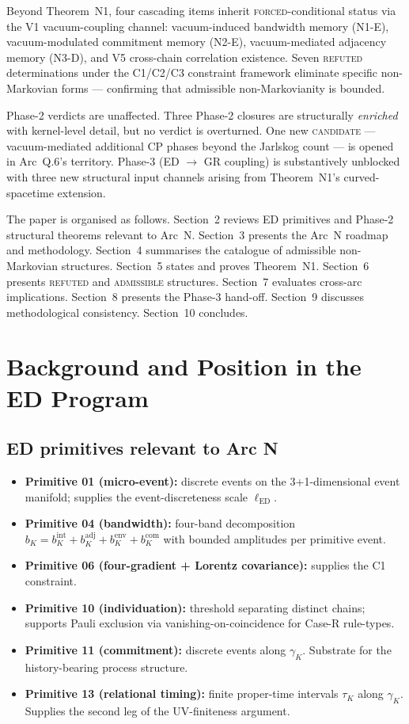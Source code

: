 \documentclass[11pt,a4paper]{article}
\begin{document}
Beyond Theorem~N1, four cascading items inherit \textsc{forced}-conditional status via the V1 vacuum-coupling channel: vacuum-induced bandwidth memory (N1-E), vacuum-modulated commitment memory (N2-E), vacuum-mediated adjacency memory (N3-D), and V5 cross-chain correlation existence. Seven \textsc{refuted} determinations under the C1/C2/C3 constraint framework eliminate specific non-Markovian forms --- confirming that admissible non-Markovianity is bounded.

Phase-2 verdicts are unaffected. Three Phase-2 closures are structurally \emph{enriched} with kernel-level detail, but no verdict is overturned. One new \textsc{candidate} --- vacuum-mediated additional CP phases beyond the Jarlskog count --- is opened in Arc~Q.6's territory. Phase-3 (ED $\to$ GR coupling) is substantively unblocked with three new structural input channels arising from Theorem~N1's curved-spacetime extension.

The paper is organised as follows. Section~2 reviews ED primitives and Phase-2 structural theorems relevant to Arc~N. Section~3 presents the Arc~N roadmap and methodology. Section~4 summarises the catalogue of admissible non-Markovian structures. Section~5 states and proves Theorem~N1. Section~6 presents \textsc{refuted} and \textsc{admissible} structures. Section~7 evaluates cross-arc implications. Section~8 presents the Phase-3 hand-off. Section~9 discusses methodological consistency. Section~10 concludes.

\section{Background and Position in the ED Program}

\subsection{ED primitives relevant to Arc N}

\begin{itemize}
  \item \textbf{Primitive 01 (micro-event):} discrete events on the 3+1-dimensional event manifold; supplies the event-discreteness scale $\ell_\mathrm{ED}$.
  \item \textbf{Primitive 04 (bandwidth):} four-band decomposition $b_K = b_K^\mathrm{int} + b_K^\mathrm{adj} + b_K^\mathrm{env} + b_K^\mathrm{com}$ with bounded amplitudes per primitive event.
  \item \textbf{Primitive 06 (four-gradient + Lorentz covariance):} supplies the C1 constraint.
  \item \textbf{Primitive 10 (individuation):} threshold separating distinct chains; supports Pauli exclusion via vanishing-on-coincidence for Case-R rule-types.
  \item \textbf{Primitive 11 (commitment):} discrete events along $\gamma_K$. Substrate for the history-bearing process structure.
  \item \textbf{Primitive 13 (relational timing):} finite proper-time intervals $\tau_K$ along $\gamma_K$. Supplies the second leg of the UV-finiteness argument.
\end{itemize}
\end{document}
